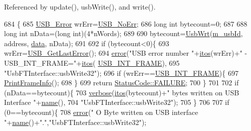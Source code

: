 Referenced by update(), usb\+Write(), and write().


\begin{DoxyCode}
684                                                               \{
685   \hyperlink{LALUsbML_8h_aa7e5a2302774d5aa1d48a2a1cfc46e86}{USB\_Error} wrErr=\hyperlink{LALUsbML_8h_ab44759ae95dd86cbc2855adf525c43cd}{USB\_NoErr};
686   \textcolor{keywordtype}{long} \textcolor{keywordtype}{int}  bytecount=0;
687 
688   \textcolor{keywordtype}{long} \textcolor{keywordtype}{int} nData=(\textcolor{keywordtype}{long} int)(4*nWords);
689 
690   bytecount=\hyperlink{LALUsbML_8h_a417eaf04d96bd2d3fca0111f8003bcb0}{UsbWrt}(\hyperlink{classUsbFTInterface_a91df5c0547e8be460bc087e27afe05aa}{m\_usbId}, address, \hyperlink{namespaceshell_a5ea2525995cedc3efd69ea8a7f034d1e}{data}, nData);
691 
692   \textcolor{keywordflow}{if} (bytecount<0)\{
693     wrErr=\hyperlink{LALUsbML_8h_a1662b77c9968848acf173f6f9c765ddd}{USB\_GetLastError}();
694     \hyperlink{classObject_a204a95f57818c0f811933917a30eff45}{error}(\textcolor{stringliteral}{"USB error number "}+\hyperlink{Tools_8h_af330027dbdafb9a30768b3613c553e60}{itos}(wrErr)+\textcolor{stringliteral}{" - USB\_INT\_FRAME="}+\hyperlink{Tools_8h_af330027dbdafb9a30768b3613c553e60}{itos}(
      \hyperlink{LALUsbML_8h_a68260f9cf3649507d12904cfa1592c11afd1c409187b1dfd3d66887a5e07e7ed3}{USB\_INT\_FRAME}),
695             \textcolor{stringliteral}{"UsbFTInterface::usbWrite32"});
696     \textcolor{keywordflow}{if} (wrErr==\hyperlink{LALUsbML_8h_a68260f9cf3649507d12904cfa1592c11afd1c409187b1dfd3d66887a5e07e7ed3}{USB\_INT\_FRAME})\{
697       \hyperlink{LALUsbML_8h_ab3398c17204ba7fb4b47eb9bbf4ba94e}{PrintFrameInfo}();
698     \} 
699     \textcolor{keywordflow}{return} \hyperlink{classStatusCode_a6f565cbeadc76d14c72f047e5e85eb4ba3da73d4c469762eb9d3c960368252b26}{StatusCode::FAILURE};
700   \}
701 
702   \textcolor{keywordflow}{if} (nData==bytecount)\{
703     \hyperlink{classObject_a83d2db2df682907ea1115ad721c1c4a1}{verbose}(\hyperlink{Tools_8h_af330027dbdafb9a30768b3613c553e60}{itos}(bytecount)+\textcolor{stringliteral}{" bytes written on USB Interface "}+\hyperlink{classObject_a300f4c05dd468c7bb8b3c968868443c1}{name}(),
704             \textcolor{stringliteral}{"UsbFTInterface::usbWrite32"});
705   \}
706   
707   \textcolor{keywordflow}{if} (0==bytecount)\{
708     \hyperlink{classObject_a204a95f57818c0f811933917a30eff45}{error}(\textcolor{stringliteral}{" O Byte written on USB interface "}+\hyperlink{classObject_a300f4c05dd468c7bb8b3c968868443c1}{name}()+\textcolor{stringliteral}{"."},\textcolor{stringliteral}{"UsbFTInterface::usbWrite32"});

\end{DoxyCode}

